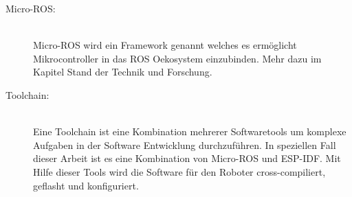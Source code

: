 \begin{flushleft}
\begin{description}
        \item[Micro-ROS:]\hfill\\
        Micro-ROS wird ein Framework genannt welches es ermöglicht Mikrocontroller in das ROS Oekosystem einzubinden.
        Mehr dazu im Kapitel Stand der Technik und Forschung. \cite{micro_ros}

        \item[Toolchain:] \hfill\\
        Eine Toolchain ist eine Kombination mehrerer Softwaretools um komplexe Aufgaben in der Software Entwicklung durchzuführen.
        In speziellen Fall dieser Arbeit ist es eine Kombination von Micro-ROS und ESP-IDF.
        Mit Hilfe dieser Tools wird die Software für den Roboter cross-compiliert, geflasht und konfiguriert. \cite{esp_idf}

        \end{description}
\end{flushleft}